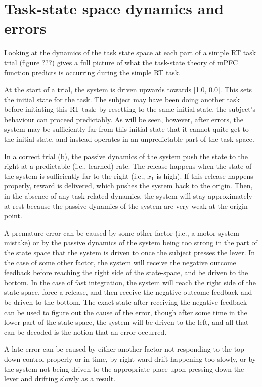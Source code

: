 \documentclass[12pt]{article}
\begin{document}
\section{Task-state space dynamics and errors}

Looking at the dynamics of the task state space
at each part of a simple RT task trial
(figure ???)
gives a full picture of what the task-state
theory of mPFC function predicts is occurring
during the simple RT task.

At the start of a trial,
the system is driven upwards towards [1.0, 0.0].
This sets the initial state for the task.
The subject may have been doing another task
before initiating this RT task;
by resetting to the same initial state,
the subject's behaviour can proceed predictably.
As will be seen, however, after errors,
the system may be sufficiently far from this
initial state that it cannot quite get to the initial state,
and instead operates in an unpredictable part of the task space.

In a correct trial (b), the passive dynamics of the system
push the state to the right
at a predictable (i.e., learned) rate.
The release happens when the state of the system
is sufficiently far to the right (i.e., $x_1$ is high).
If this release happens properly, reward is delivered,
which pushes the system back to the origin.
Then, in the absence of any task-related dynamics,
the system will stay approximately at rest
because the passive dynamics of the system are very weak
at the origin point.

A premature error can be caused by some other factor
(i.e., a motor system mistake) or by the passive dynamics
of the system being too strong in the part of the state space
that the system is driven to once the subject presses the lever.
In the case of some other factor,
the system will receive the negative outcome feedback
before reaching the right side of the state-space,
and be driven to the bottom.
In the case of fast integration,
the system will reach the right side of the state-space,
force a release, and then receive the negative outcome feedback
and be driven to the bottom.
The exact state after receiving the negative feedback
can be used to figure out the cause of the error,
though after some time in the lower part
of the state space, the system will be
driven to the left,
and all that can be decoded
is the notion that an error occurred.

A late error can be caused by either another factor
not responding to the top-down control properly or in time,
by right-ward drift happening too slowly,
or by the system not being driven
to the appropriate place upon pressing down the lever
and drifting slowly as a result.
\end{document}

